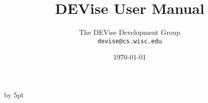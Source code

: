 %
%
%
%
%


\renewcommand{\topfraction}{1.0}
\renewcommand{\bottomfraction}{1.0}
\renewcommand{\textfraction}{0.0}
\advance\intextsep by 5pt

\def\filename#1{{\tt #1}}
\def\code#1{{\tt #1}}
\def\menu#1{{\tt #1}}
\def\term#1{#1}
\def\variable#1{{\tt #1}}

\def\scaleepspic[#1]#2#3{
\begin{figure}[htb]
\centering\leavevmode\epsfxsize=#1\epsfbox{#2}
\caption{#3}
\end{figure}
}

\def\fullepspic#1#2{
\begin{figure}[htb]
\centering\leavevmode\epsfxsize=\textwidth\epsfbox{#1}
\caption{#2}
\end{figure}
}


\title{DEVise User Manual}
\author{The DEVise Development Group \\
\code{devise@cs.wisc.edu}
}
\date{\today}

